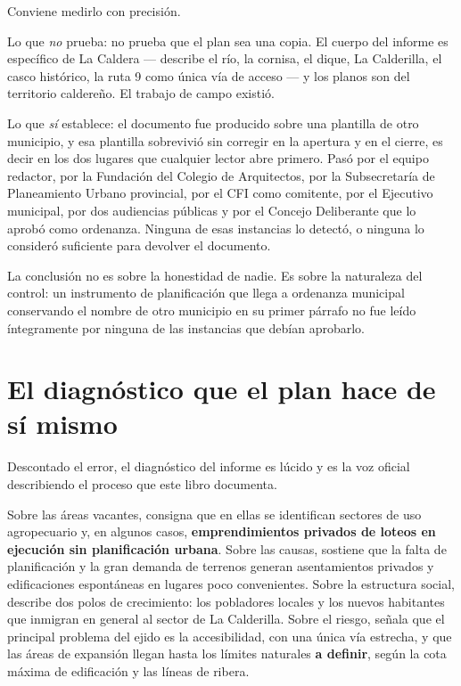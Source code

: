 \begin{cautela}
Conviene medirlo con precisión.

Lo que \textit{no} prueba: no prueba que el plan sea una copia. El cuerpo del informe es específico de La Caldera --- describe el río, la cornisa, el dique, La Calderilla, el casco histórico, la ruta 9 como única vía de acceso --- y los planos son del territorio caldereño. El trabajo de campo existió.

Lo que \textit{sí} establece: el documento fue producido sobre una plantilla de otro municipio, y esa plantilla sobrevivió sin corregir en la apertura y en el cierre, es decir en los dos lugares que cualquier lector abre primero. Pasó por el equipo redactor, por la Fundación del Colegio de Arquitectos, por la Subsecretaría de Planeamiento Urbano provincial, por el CFI como comitente, por el Ejecutivo municipal, por dos audiencias públicas y por el Concejo Deliberante que lo aprobó como ordenanza. Ninguna de esas instancias lo detectó, o ninguna lo consideró suficiente para devolver el documento.

La conclusión no es sobre la honestidad de nadie. Es sobre la naturaleza del control: un instrumento de planificación que llega a ordenanza municipal conservando el nombre de otro municipio en su primer párrafo no fue leído íntegramente por ninguna de las instancias que debían aprobarlo.
\end{cautela}

\section{El diagnóstico que el plan hace de sí mismo}

Descontado el error, el diagnóstico del informe es lúcido y es la voz oficial describiendo el proceso que este libro documenta.

Sobre las áreas vacantes, consigna que en ellas se identifican sectores de uso agropecuario y, en algunos casos, \textbf{emprendimientos privados de loteos en ejecución sin planificación urbana}. Sobre las causas, sostiene que la falta de planificación y la gran demanda de terrenos generan asentamientos privados y edificaciones espontáneas en lugares poco convenientes. Sobre la estructura social, describe dos polos de crecimiento: los pobladores locales y los nuevos habitantes que inmigran en general al sector de La Calderilla. Sobre el riesgo, señala que el principal problema del ejido es la accesibilidad, con una única vía estrecha, y que las áreas de expansión llegan hasta los límites naturales \textbf{a definir}, según la cota máxima de edificación y las líneas de ribera.

